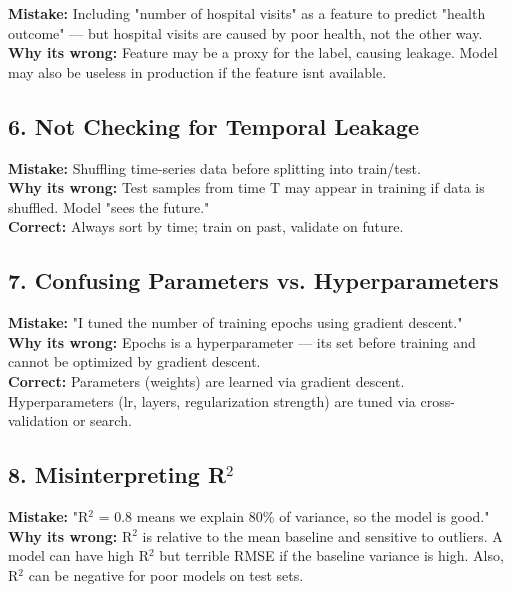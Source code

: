 \documentclass[11pt]{article}
\begin{document}
\textbf{Mistake:} Including "number of hospital visits" as a feature to predict "health outcome" --- but hospital visits are caused by poor health, not the other way.\\
\textbf{Why it\textquotesingle s wrong:} Feature may be a proxy for the label, causing leakage. Model may also be useless in production if the feature isn\textquotesingle t available.

\subsection{6. Not Checking for Temporal Leakage}\label{6-not-checking-for-temporal-leakage}

\textbf{Mistake:} Shuffling time-series data before splitting into train/test.\\
\textbf{Why it\textquotesingle s wrong:} Test samples from time T may appear in training if data is shuffled. Model "sees the future."\\
\textbf{Correct:} Always sort by time; train on past, validate on future.

\subsection{7. Confusing Parameters vs. Hyperparameters}\label{7-confusing-parameters-vs-hyperparameters}

\textbf{Mistake:} "I tuned the number of training epochs using gradient descent."\\
\textbf{Why it\textquotesingle s wrong:} Epochs is a hyperparameter --- it\textquotesingle s set before training and cannot be optimized by gradient descent.\\
\textbf{Correct:} Parameters (weights) are learned via gradient descent. Hyperparameters (lr, layers, regularization strength) are tuned via cross-validation or search.

\subsection{\texorpdfstring{8. Misinterpreting R\(^2\)}{8. Misinterpreting R\^{}2}}\label{8-misinterpreting-r2}

\textbf{Mistake:} "R\(^2\) = 0.8 means we explain 80\% of variance, so the model is good."\\
\textbf{Why it\textquotesingle s wrong:} R\(^2\) is relative to the mean baseline and sensitive to outliers. A model can have high R\(^2\) but terrible RMSE if the baseline variance is high. Also, R\(^2\) can be negative for poor models on test sets.
\end{document}
